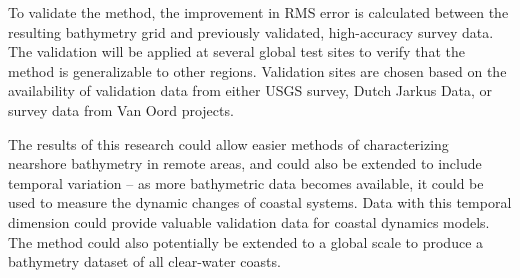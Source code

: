 
\noindent To validate the method, the improvement in RMS error is calculated between the resulting bathymetry grid and previously validated, high-accuracy survey data. The validation will be applied at several global test sites to verify that the method is generalizable to other regions. Validation sites are chosen based on the availability of validation data from either USGS survey, Dutch Jarkus Data, or survey data from Van Oord projects. 


\noindent The results of this research could allow easier methods of characterizing nearshore bathymetry in remote areas, and could also be extended to include temporal variation – as more bathymetric data becomes available, it could be used to measure the dynamic changes of coastal systems. Data with this temporal dimension could provide valuable validation data for coastal dynamics models. The method could also potentially be extended to a global scale to produce a bathymetry dataset of all clear-water coasts.
